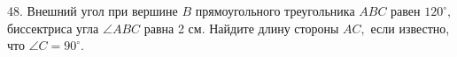 48. Внешний угол при вершине $B$ прямоугольного треугольника $ABC$ равен $120^\circ,$ биссектриса угла $\angle ABC$ равна 2 см. Найдите длину стороны $AC,$ если известно, что $\angle C=90^\circ.$\\
